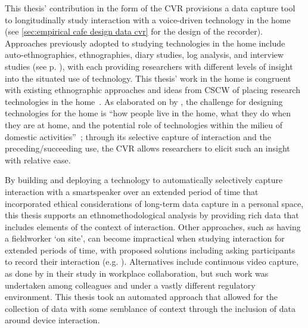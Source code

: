 \begin{corrections}
This thesis' contribution in the form of the \ac{CVR} provisions a data capture tool to longitudinally study interaction with a voice-driven technology in the home (see \ref{sec:empirical cafe design data cvr} for the design of the recorder).
Approaches previously adopted to studying technologies in the home include auto-ethnographies, ethnographies, diary studies, log analysis, and interview studies (see p. \pageref{line:prevhomestudy}), with each providing researchers with different levels of insight into the situated use of technology.
This thesis' work in the home is congruent with existing ethnographic approaches and ideas from \ac{CSCW} of placing research technologies in the home~\citep{Tolmie2008a}.
As elaborated on by \citet{Crabtree2003}, the challenge for designing technologies for the home is ``how people live in the home, what they do when they are at home, and the potential role of technologies within the milieu of domestic activities''~\citep{Crabtree2003}; through its selective capture of interaction and the preceding/succeeding use, the \ac{CVR} allows researchers to elicit such an insight with relative ease.

By building and deploying a technology to automatically selectively capture interaction with a smartspeaker over an extended period of time that incorporated ethical considerations of long-term data capture in a personal space, this thesis supports an ethnomethodological analysis by providing rich data that includes elements of the context of interaction.
Other approaches, such as having a fieldworker `on site', can become impractical when studying interaction for extended periods of time, with proposed solutions including asking participants to record their interaction (e.g. \citet{Rooksby2015}).
Alternatives include continuous video capture, as done by \citet{Heath1991} in their study in workplace collaboration, but such work was undertaken among colleagues and under a vastly different regulatory environment.
This thesis took an automated approach that allowed for the collection of data with some semblance of context through the inclusion of data around device interaction.


\end{corrections}
